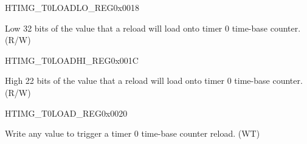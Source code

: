 \begin{register}{H}{TIMG\_T0LOADLO\_REG}{0x0018}\label{regdesc:TIMGTXLOADLOREG}
%
\regnewline%
\begin{regdesc}\begin{reglist}
\label{fielddesc:TIMGTXLOADLO}\item [TIMG\_T0\_LOAD\_LO] Low 32 bits of the value that a reload will load onto timer 0 time-base
counter. (R/W)
\end{reglist}\end{regdesc}
\end{register}


\begin{register}{H}{TIMG\_T0LOADHI\_REG}{0x001C}\label{regdesc:TIMGTXLOADHIREG}
%
%
\regnewline%
\begin{regdesc}\begin{reglist}
\label{fielddesc:TIMGTXLOADHI}\item [TIMG\_T0\_LOAD\_HI] High 22 bits of the value that a reload will load onto timer 0 time-base
counter. (R/W)
\end{reglist}\end{regdesc}
\end{register}


\begin{register}{H}{TIMG\_T0LOAD\_REG}{0x0020}\label{regdesc:TIMGTXLOADREG}
%
\regnewline%
\begin{regdesc}\begin{reglist}
\label{fielddesc:TIMGTXLOAD}\item [TIMG\_T0\_LOAD]
Write any value to trigger a timer 0 time-base counter reload. (WT)
\end{reglist}\end{regdesc}
\end{register}


